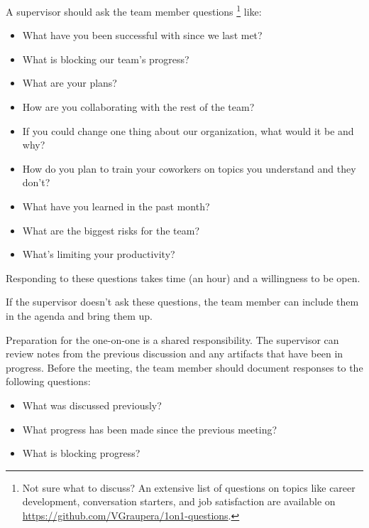A supervisor should ask the team member questions
\footnote{Not sure what to discuss? An extensive list of questions on topics like career development, conversation starters, and job satisfaction are available on 
\href{https://github.com/VGraupera/1on1-questions}{https://github.com/VGraupera/1on1-questions}.}
like:
\begin{itemize}
    \item What have you been successful with since we last met?
    \item What is blocking our team's progress?
    \item What are your plans?
    \item How are you collaborating with the rest of the team?
    \item If you could change one thing about our organization, what would it be and why?
    \item How do you plan to train your coworkers on topics you understand and they don't?
    \item What have you learned in the past month?
    \item What are the biggest risks for the team?
    \item What's limiting your productivity?
\end{itemize}
Responding to these questions takes time (an hour) and a willingness to be open. 

If the supervisor doesn't ask these questions, the team member can include them in the agenda and bring them up. 

Preparation for the one-on-one is a shared responsibility. The supervisor can review notes from the previous discussion and any artifacts that have been in progress. Before the meeting, the team member should document responses to the following questions:
\begin{itemize}
    \item What was discussed previously?
    \item What progress has been made since the previous meeting?
    \item What is blocking progress?
\end{itemize}

